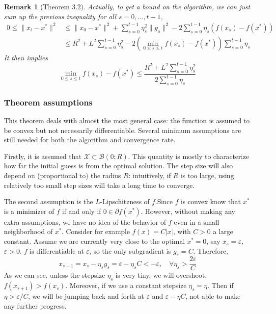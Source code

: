 \documentclass{scrartcl}
\newtheorem*{remark}{Remark}
\newcommand{\sB}{\mathcal{B}}
\newcommand{\sX}{\mathcal{X}}
\begin{document}
\begin{remark}[Theorem 3.2]
Actually, to get a bound on the algorithm, we can just sum up the previous inequality for all
$s=0,\ldots,t-1$,
\[
  \begin{aligned}
    0\leq\|x_t-x^*\|^2
    &\leq \|x_0-x^*\|^2 + \sum_{s=0}^{t-1}\eta_s^2\|g_s\|^2 - 2\sum_{s=0}^{t-1}\eta_s \left(f(x_s)-f
    (x^*)\right) \\
    &\leq R^2 + L^2\sum_{s=0}^{t-1}\eta_s^2 -2\left(\min_{0\leq s\leq t}f(x_s) - f
    (x^*)\right)\sum_{s=0}^{t-1}\eta_s
  \end{aligned}
\]
It then implies
\begin{equation}
\min_{0\leq s\leq t}f(x_s) - f(x^*)
\leq \frac{R^2 + L^2\sum_{s=0}^{t-1}\eta_s^2}{2\sum_{s=0}^ {t-1}\eta_s}
\label{eq:subgrad-descent-convergence-0}
\end{equation}
\end{remark}

\subsubsection*{Theorem assumptions}
This theorem deals with almost the most general case: the function is
assumed to be convex but not necessarily differentiable. Several minimum assumptions are still
needed for both the algorithm and convergence rate.

Firstly, it is assumed that $\sX\subset \sB(0; R)$. This quantity is mostly to characterize how far
the initial guess is from the optimal solution. The step size will also depend on (proportional to)
the radius $R$: intuitively, if $R$ is too large, using relatively too small step sizes will take a
long time to converge.

The second assumption is the $L$-Lipschitzness of $f$.Since $f$ is convex know that $x^*$ is a
minimizer of $f$ if and only if $0\in\partial f (x^*)$. However, without making any extra
assumptions, we have no idea of the behavior of $f$ even in a small neighborhood of $x^*$. Consider
for example $f(x)=C|x|$, with $C>0$ a large constant. Assume we are currently very close to the
optimal $x^*=0$, say $x_s=\varepsilon$, $\varepsilon>0$. $f$ is differentiable at $\varepsilon$, so
the only subgradient is $g_s=C$. Therefore,
\[
  x_{s+1} = x_s - \eta_s g_s
  = \varepsilon - \eta_sC < -\varepsilon, \quad \forall \eta_s > \frac {2\varepsilon} {C}
\]
As we can see, unless the stepsize $\eta_s$ is very tiny, we will overshoot, $f(x_{s+1})>f(x_s)$.
Moreover, if we use a constant stepsize $\eta_s=\eta$. Then if $\eta >\varepsilon/C$, we will be
jumping back and forth at $\varepsilon$ and $\varepsilon - \eta C$, not able to make any further
progress.
\end{document}
